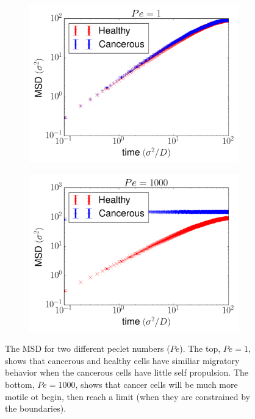 \documentclass[aps,prb,twocolumn,groupedaddress,nofootinbib,floatfix]{revtex4}
\begin{document}
\begin{figure}
  \begin{subfigure}{\columnwidth}
    \includegraphics[width=1.0\columnwidth]{images/pe1.png}
  \end{subfigure}
  \begin{subfigure}{\columnwidth}
    \includegraphics[width=1.0\columnwidth]{images/pe1000.png}
  \end{subfigure}
  \caption{The MSD for two different peclet numbers ($Pe$). The top, $Pe=1$, shows that cancerous and healthy cells have similiar migratory behavior when the cancerous cells have little self propulsion. The bottom, $Pe=1000$, shows that cancer cells will be much more motile ot begin, then reach a limit (when they are constrained by the boundaries).}
  \label{fig:prop}
\end{figure}
\end{document}
